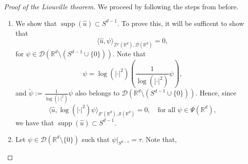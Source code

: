 \documentclass[11pt]{amsart}
\DeclareMathOperator{\supp}{supp}
\newcommand{\R}{\mathbb{R}}
\begin{document}
\begin{proof}[Proof of the Liouville theorem]
We proceed by following the steps from before. 
\begin{enumerate}
	
	\item[Step 1.]

We show that $\supp(\hat{u})\subset S^{d-1}$. To prove this, it will be sufficent to show that 
\begin{equation*}
	\langle \hat{u},\psi\rangle_{\mathcal{D}'(\R^d),\mathcal{D}(\R^d)}=0,
\end{equation*}
for $\psi \in \mathcal{D}(\R^d\setminus(S^{d-1}\cup \{0\}))$. 
Note that 
\begin{equation*}
	\psi=\log(|\cdot|^2)\left (\frac{1}{\log(|\cdot|^2)}\psi\right ),
\end{equation*}
and $\tilde{\psi}:=\frac{1}{\log(|\cdot|^2)}\psi$ also belongs to $\mathcal{D}(\R^d\setminus(S^{d-1}\cup \{0\}))$. Hence, since 
\begin{equation*}
\langle \hat{u},\log(|\cdot|^2)\psi\rangle_{\mathcal{S}'(\R^d),\mathcal{S}(\R^d)}=0, \quad \text{for all $\psi \in \Psi(\R^d)$}, 
\end{equation*}
we have that $\supp(\hat{u})\subset S^{d-1}$. 
\item[Step 2.] 
Let $\psi\in \mathcal{D}(\R^d\setminus\{0\})$ such that $\psi|_{S^{d-1}}=\tau$. Note that, 


\end{enumerate}
\end{proof}
\end{document}
